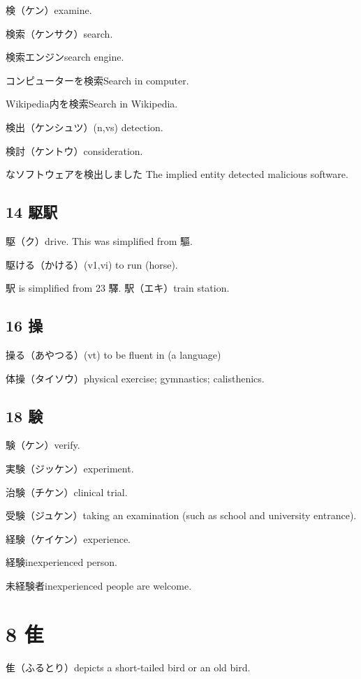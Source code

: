 検（ケン）examine.

検索（ケンサク）search.

検索エンジンsearch engine.

コンピューターを検索Search in computer.

Wikipedia内を検索Search in Wikipedia.

検出（ケンシュツ）(n,vs) detection.

検討（ケントウ）consideration.

なソフトウェアを検出しました
The implied entity detected malicious software.

\subsection{14 駆駅}

駆（ク）drive.
This was simplified from 驅.

駆ける（かける）(v1,vi) to run (horse).

駅 is simplified from 23 驛.
駅（エキ）train station.

\subsection{16 操}

操る（あやつる）(vt) to be fluent in (a language)

体操（タイソウ）physical exercise; gymnastics; calisthenics.

\subsection{18 験}

験（ケン）verify.

実験（ジッケン）experiment.

治験（チケン）clinical trial.

受験（ジュケン）taking an examination (such as school and university entrance).

経験（ケイケン）experience.

経験inexperienced person.

未経験者inexperienced people are welcome.

\section{8 隹}

隹（ふるとり）depicts a short-tailed bird or an old bird.

